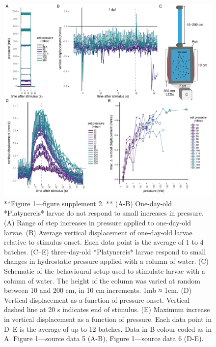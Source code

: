 \documentclass[
]{article}
\begin{document}
\begin{figure}
\includegraphics[width=36.11in]{Figures/Figure1-FigureSupplement2} \caption{**Figure 1—figure supplement 2. **  (A-B) One-day-old *Platynereis* larvae  do not respond  to small increases in pressure. (A) Range of step increases in pressure applied to one-day-old larvae. (B) Average vertical displacement of one-day-old larvae relative to stimulus onset. Each data point is the average of 1 to 4 batches. (C–E) three-day-old *Platynereis* larvae respond to small changes in hydrostatic pressure applied with a column of water. (C) Schematic of the behavioural setup used to stimulate larvae with a column of water. The height of the column was varied at random between 10 and 200 cm, in 10 cm increments. 1mb ≈ 1cm. (D) Vertical displacement as a function of pressure onset. Vertical dashed line at 20 s indicates end of stimulus. (E) Maximum increase in vertical displacement as a function of pressure. Each data point in D–E is the average of up to 12 batches. Data in B colour-coded as in A. Figure 1---source data 5 (A-B), Figure 1---source data 6 (D-E). }\label{fig:unnamed-chunk-8}
\end{figure}
\end{document}
